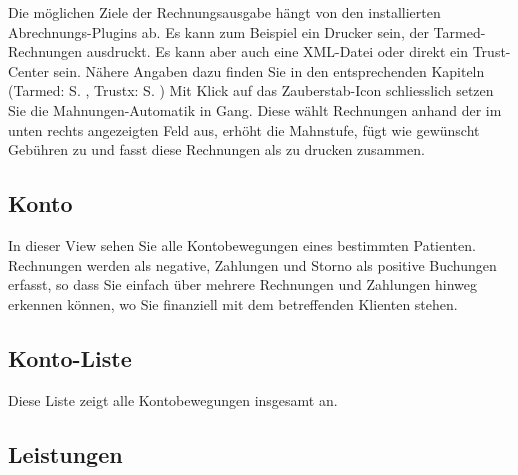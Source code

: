 Die möglichen Ziele der Rechnungsausgabe hängt von den installierten Abrechnungs-Plugins ab. Es kann zum Beispiel ein Drucker sein, der Tarmed-Rechnungen ausdruckt. Es kann aber auch eine XML-Datei oder direkt ein Trust-Center sein. Nähere Angaben dazu finden Sie in den entsprechenden Kapiteln (Tarmed: S. \pageref{arzttarife}, Trustx: S. \pageref{trustx})
\bigskip
Mit Klick auf das Zauberstab-Icon schliesslich setzen Sie die Mahnungen-Automatik in Gang. Diese wählt Rechnungen anhand der im unten rechts angezeigten Feld aus, erhöht die Mahnstufe, fügt wie gewünscht Gebühren zu und fasst diese Rechnungen als \glqq zu drucken\grqq{} zusammen.

\subsection{Konto}
In dieser View sehen Sie alle Kontobewegungen eines bestimmten Patienten.
Rechnungen werden als negative, Zahlungen und Storno als positive
Buchungen erfasst, so dass Sie einfach über mehrere Rechnungen und Zahlungen
hinweg erkennen können, wo Sie finanziell mit dem betreffenden Klienten stehen.

\subsection{Konto-Liste}
Diese Liste zeigt alle Kontobewegungen insgesamt an.

\subsection{Leistungen}




